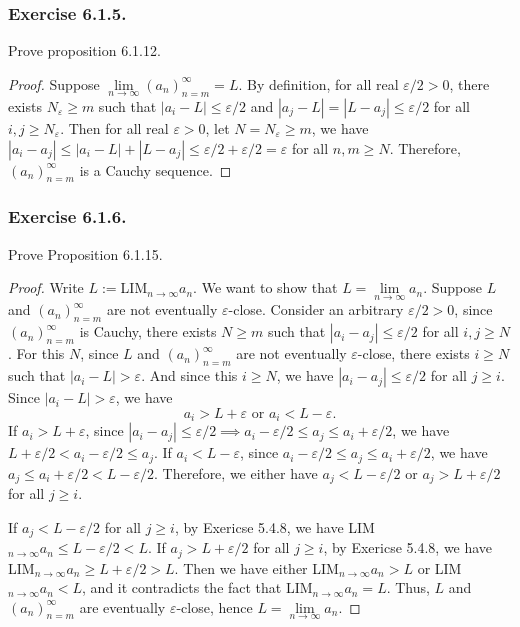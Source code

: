\documentclass[12pt, letter]{article}
\newcommand{\an}{(a_n)_{n=m}^\infty}
\begin{document}
\subsubsection*{Exercise 6.1.5.}
Prove proposition 6.1.12.
\begin{proof}
    Suppose $\lim\limits_{n\to\infty}\an=L$. By definition, for all real $\varepsilon/2>0$, there exists $N_\varepsilon\geq m$ such that $|a_i-L|\leq\varepsilon/2$ and $|a_j-L|=|L-a_j|\leq\varepsilon/2$
    for all $i,j\geq N_\varepsilon$. Then for all real $\varepsilon>0$, let $N=N_\varepsilon\geq m$, we have $|a_i-a_j|\leq |a_i-L|+|L-a_j|\leq \varepsilon/2+\varepsilon/2=\varepsilon$ for all $n,m\geq N$.
    Therefore, $\an$ is a Cauchy sequence.
\end{proof}
\subsubsection*{Exercise 6.1.6.}
Prove Proposition 6.1.15.
\begin{proof}
    Write $L:=$LIM$_{n\to\infty}a_n$. We want to show that $L=\lim\limits_{n\to\infty}a_n$. Suppose $L$ and $\an$ are not eventually $\varepsilon$-close.
    Consider an arbitrary $\varepsilon/2>0$, since $\an$ is Cauchy, there exists $N\geq m$ such that $|a_i-a_j|\leq\varepsilon/2$ for all $i,j\geq N$. For this $N$, since $L$ and $\an$
    are not eventually $\varepsilon$-close, there exists $i\geq N$ such that $|a_i-L|>\varepsilon$. And since this $i\geq N$, we have $|a_i-a_j|\leq\varepsilon/2$ for all $j\geq i$.
    Since $|a_i-L|>\varepsilon$, we have 
    \begin{equation*}
        a_i > L+\varepsilon\text{ or }a_i < L-\varepsilon.
    \end{equation*}
    If $a_i>L+\varepsilon$, since $|a_i-a_j|\leq\varepsilon/2\implies a_i-\varepsilon/2\leq a_j\leq a_i+\varepsilon/2$, we have $L+\varepsilon/2<a_i-\varepsilon/2\leq a_j$.
    If $a_i<L-\varepsilon$, since $a_i-\varepsilon/2\leq a_j\leq a_i+\varepsilon/2$, we have $a_j\leq a_i+\varepsilon/2<L-\varepsilon/2$. Therefore, we either have $a_j<L-\varepsilon/2$
    or $a_j>L+\varepsilon/2$ for all $j\geq i$. 

    If $a_j<L-\varepsilon/2$ for all $j\geq i$, by Exericse 5.4.8, we have LIM$_{n\to\infty}a_n\leq L-\varepsilon/2<L$. If $a_j>L+\varepsilon/2$ for all $j\geq i$, by Exericse 5.4.8, we have LIM$_{n\to\infty}a_n\geq L+\varepsilon/2>L$.
    Then we have either LIM$_{n\to\infty}a_n>L$ or LIM$_{n\to\infty}a_n<L$, and it contradicts the fact that LIM$_{n\to\infty}a_n=L$.
    Thus, $L$ and $\an$ are eventually $\varepsilon$-close, hence $L=\lim\limits_{n\to\infty}a_n$.
\end{proof}
\end{document}
